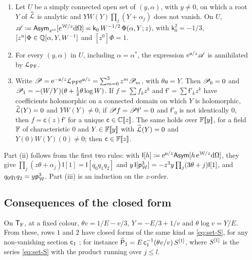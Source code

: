 \begin{prop}
\label{prop:row-sp}
\begin{enumerate}
\item Let $U$ be a simply connected open set of $(y,\alpha)$, with $y\neq0$, on which a root $Y$ of $\widehat{\mathcal{L}}$ is analytic and $YW(Y)\prod_j(Y+\alpha_j)$ does not vanish. On $U$,
$\mathscr{A}\coloneqq\mathsf{Asym}_{x^{\mathrm{cr}}}[\mathrm{e}^{\mathcal{W}/z}\mathrm{d}\Omega]=\mathsf{k}_0\,W^{-1/2}\,\Phi(\alpha,Y;z)$,
with $\mathsf{k}_0^2=-1/3$, $[z^n]\Phi\in\mathbb{Q}[\alpha,Y,W^{-1}]$ and $[z^0]\Phi=1$.
\item For every $(y,\alpha)$ in $U$, including $\alpha=\alpha^*$, the expression $\mathrm{e}^{\mathsf{u}/z}\mathscr{A}$ is annihilated by $\mathcal{L}_{\mathrm{PF}}$.
\item Write $\mathscr{P}=\mathrm{e}^{-\mathsf{u}/z}\mathcal{L}_{\mathrm{PF}}\mathrm{e}^{\mathsf{u}/z}=\sum_{m=0}^{3}z^m\mathscr{P}_m$, with $\theta\mathsf{u}=Y$. Then $\mathscr{P}_0=0$ and $\mathscr{P}_1=-(W/Y)(\theta+\frac12\theta\log W)$. If $f=\sum f_kz^k$ and $\mathsf{f}'=\sum\mathsf{f}'_kz^k$ have coefficients holomorphic on a connected domain on which $Y$ is holomorphic, $\widehat{\mathcal{L}}(Y)=0$ and $YW(Y)\neq0$, if $\mathscr{P} f=\mathscr{P}\mathsf{f}'=0$ and $\mathsf{f}'_0$ is not identically $0$, then $f=\mathsf{c}(z)\mathsf{f}'$ for a unique $\mathsf{c}\in\mathbb{C}[\![ z ]\!]$. The same holds over $\mathbb{F}[\![ y ]\!]$, for a field $\mathbb{F}$ of characteristic $0$ and $Y\in\mathbb{F}[\![ y ]\!]$ with $\widehat{\mathcal{L}}(Y)=0$ and $Y(0)W(Y)(0)\neq0$; then $\mathsf{c}\in\mathbb{F}[\![ z ]\!]$.
\end{enumerate}
\end{prop}

Part (ii) follows from the first two rules: with $\mathsf{I}[h]\coloneqq\mathrm{e}^{\mathsf{u}/z}\mathsf{Asym}[h\,\mathrm{e}^{\mathcal{W}/z}\mathrm{d}\Omega]$, they give $\prod_j(z\theta+\alpha_j)\mathsf{I}[1]=\mathsf{I}[q_0q_1q_2]$ and $y\,\mathsf{I}[\mathsf{p}_{\mathcal{W}}^3]=-z^3y\prod_j(3\theta+j)\mathsf{I}[1]$, and $q_0q_1q_2=y\mathsf{p}_{\mathcal{W}}^3$. Part (iii) is an induction on the $z$-order.

\subsection{Consequences of the closed form}
\label{sec:row-conseq}

On $\mathsf{T}_{\mathrm{F}}$, at a fixed colour, $\theta v=1/E-v/3$, $Y=-E/3+1/v$ and $\theta\log v=Y/E$. From these, rows $1$ and $2$ have closed forms of the same kind as \eqref{eq:set-S}, for any non-vanishing section $\mathsf{c}_{1}$ ; for instance $\widehat{\mathsf{P}}_1=E\,\mathsf{c}_{1}^{-1}(\theta v/v)\,S^{[1]}$, where $S^{[1]}$ is the series \eqref{eq:set-S} with the product running over $j\leq l$.

